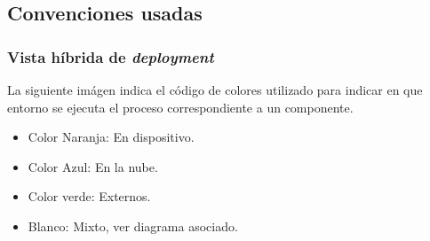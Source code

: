 \subsection{Convenciones usadas}

\subsubsection{Vista híbrida de \textit{deployment}}

La siguiente imágen indica el código de colores utilizado para indicar en que entorno
se ejecuta el proceso correspondiente a un componente.


\begin{itemize}
	\item Color Naranja: En dispositivo.
	\item Color Azul: En la nube.
	\item Color verde: Externos.
	\item Blanco: Mixto, ver diagrama asociado.
\end{itemize}
